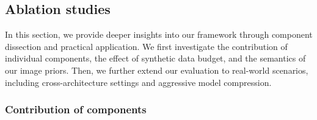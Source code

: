\subsection{Ablation studies} \label{ch4:ssec:04-experiments-ablation}
\begin{foldable}
    In this section, we provide deeper insights into our framework through component dissection and practical application.
    We first investigate the contribution of individual components, the effect of synthetic data budget, and the semantics of our image priors.
    Then, we further extend our evaluation to real-world scenarios, including cross-architecture settings and aggressive model compression.
\end{foldable}


\subsubsection{Contribution of components} \label{ch4:sssec:04-experiments-ablation-components}

